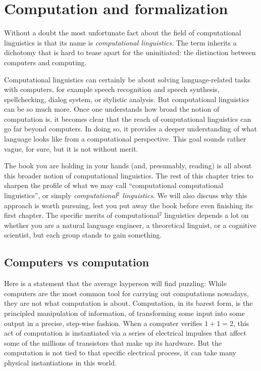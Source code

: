 \chapter{Computation and formalization}
\label{cha:Formal}

Without a doubt the most unfortunate fact about the field of computational linguistics is that its name is \emph{computational linguistics}.
The term inherits a dichotomy that is hard to tease apart for the uninitiated: the distinction between computers and computing.

Computational linguistics can certainly be about solving language-related tasks with computers, for example speech recognition and speech synthesis, spellchecking, dialog system, or stylistic analysis.
But computational linguistics can be so much more.
Once one understands how broad the notion of computation is, it becomes clear that the reach of computational linguistics can go far beyond computers.
In doing so, it provides a deeper understanding of what language looks like from a computational perspective.
This goal sounds rather vague, for sure, but it is not without merit.

The book you are holding in your hands (and, presumably, reading) is all about this broader notion of computational linguistics.
The rest of this chapter tries to sharpen the profile of what we may call ``computational computational linguistics'', or simply \emph{computational$^2$ linguistics}.
We will also discuss why this approach is worth pursuing, lest you put away the book before even finishing its first chapter.
The specific merits of computational$^2$ linguistics depends a lot on whether you are a natural language engineer, a theoretical linguist, or a cognitive scientist, but each group stands to gain something.


\section{Computers vs computation}

Here is a statement that the average layperson will find puzzling:
While computers are the most common tool for carrying out computations nowadays, they are not what computation is about.
Computation, in its barest form, is the principled manipulation of information, of transforming some input into some output in a precise, step-wise fashion.
When a computer verifies $1 + 1 = 2$, this act of computation is instantiated via a series of electrical impulses that affect some of the millions of transistors that make up its hardware.
But the computation is not tied to that specific electrical process, it can take many physical instantiations in this world.

